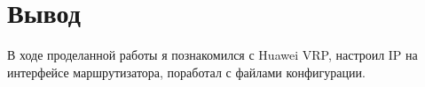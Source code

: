 \chapter{Вывод}
В ходе проделанной работы я познакомился с Huawei VRP, настроил IP на интерфейсе маршрутизатора, поработал с файлами конфигурации.